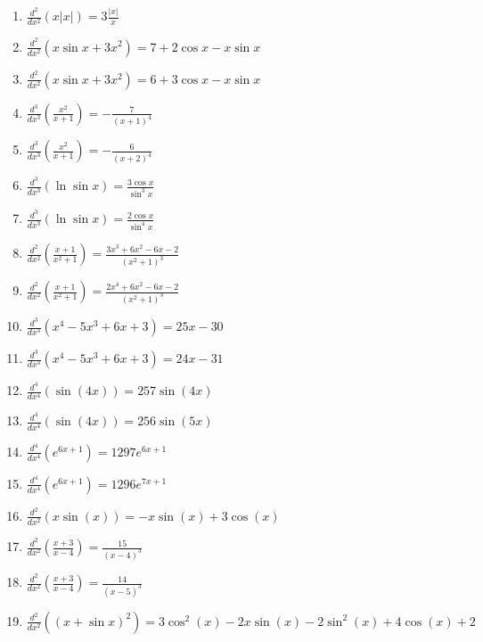 \documentclass[11pt,a4paper]{article}
\begin{document}
\begin{enumerate}
\item $\displaystyle \frac{d^{2}}{dx^{2}}\left( x|x| \right) = 3\frac{|x|}{x}$
\item $\displaystyle \frac{d^{2}}{dx^{2}}\left( x\sin x + 3x^{2} \right) = 7 + 2\cos x - x\sin x$
\item $\displaystyle \frac{d^{2}}{dx^{2}}\left( x\sin x + 3x^{2} \right) = 6 + 3\cos x - x\sin x$
\item $\displaystyle \frac{d^{3}}{dx^{3}}\left( \frac{x^{2}}{x + 1} \right) = -\frac{7}{(x + 1)^{4}}$
\item $\displaystyle \frac{d^{3}}{dx^{3}}\left( \frac{x^{2}}{x + 1} \right) = -\frac{6}{(x + 2)^{4}}$
\item $\displaystyle \frac{d^{3}}{dx^{3}}\left( \ln\sin x \right) = \frac{3\cos x}{\sin^{3} x}$
\item $\displaystyle \frac{d^{3}}{dx^{3}}\left( \ln\sin x \right) = \frac{2\cos x}{\sin^{4} x}$
\item $\displaystyle \frac{d^{2}}{dx^{2}}\left( \frac{x + 1}{x^{2} + 1} \right) = \frac{3x^{3} + 6x^{2} - 6x - 2}{(x^{2} + 1)^{3}}$
\item $\displaystyle \frac{d^{2}}{dx^{2}}\left( \frac{x + 1}{x^{2} + 1} \right) = \frac{2x^{4} + 6x^{2} - 6x - 2}{(x^{2} + 1)^{3}}$
\item $\displaystyle \frac{d^{3}}{dx^{3}}\left( x^{4} - 5x^{3} + 6x + 3 \right) = 25x - 30$
\item $\displaystyle \frac{d^{3}}{dx^{3}}\left( x^{4} - 5x^{3} + 6x + 3 \right) = 24x - 31$
\item $\displaystyle \frac{d^{4}}{dx^{4}}\left( \sin(4x) \right) = 257\sin(4x)$
\item $\displaystyle \frac{d^{4}}{dx^{4}}\left( \sin(4x) \right) = 256\sin(5x)$
\item $\displaystyle \frac{d^{4}}{dx^{4}}\left( e^{6x + 1} \right) = 1297e^{6x + 1}$
\item $\displaystyle \frac{d^{4}}{dx^{4}}\left( e^{6x + 1} \right) = 1296e^{7x + 1}$
\item $\displaystyle \frac{d^{2}}{dx^{2}}\left( x\sin(x) \right) = -x\sin(x) + 3\cos(x)$
\item $\displaystyle \frac{d^{2}}{dx^{2}}\left( \frac{x + 3}{x - 4} \right) = \frac{15}{(x - 4)^{3}}$
\item $\displaystyle \frac{d^{2}}{dx^{2}}\left( \frac{x + 3}{x - 4} \right) = \frac{14}{(x - 5)^{3}}$
\item $\displaystyle \frac{d^{2}}{dx^{2}}\left( (x + \sin x)^{2} \right) = 3\cos^{2}(x) - 2x\sin(x) - 2\sin^{2}(x) + 4\cos(x) + 2$

\end{enumerate}
\end{document}
